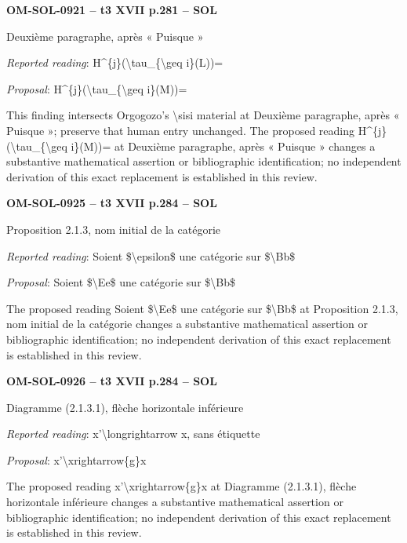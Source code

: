 \par\noindent\textbf{OM-SOL-0921 -- t3 XVII p.281 -- SOL}\par
Deuxième paragraphe, après « Puisque »\par
\emph{Reported reading}: H\textasciicircum{}\{j\}(\textbackslash{}tau\_\{\textbackslash{}geq i\}(L))=\par
\emph{Proposal}: H\textasciicircum{}\{j\}(\textbackslash{}tau\_\{\textbackslash{}geq i\}(M))=\par
This finding intersects Orgogozo's \textbackslash{}sisi material at Deuxième paragraphe, après « Puisque »; preserve that human entry unchanged. The proposed reading H\textasciicircum{}\{j\}(\textbackslash{}tau\_\{\textbackslash{}geq i\}(M))= at Deuxième paragraphe, après « Puisque » changes a substantive mathematical assertion or bibliographic identification; no independent derivation of this exact replacement is established in this review.\par
\par\noindent\textbf{OM-SOL-0925 -- t3 XVII p.284 -- SOL}\par
Proposition 2.1.3, nom initial de la catégorie\par
\emph{Reported reading}: Soient \$\textbackslash{}epsilon\$ une catégorie sur \$\textbackslash{}Bb\$\par
\emph{Proposal}: Soient \$\textbackslash{}Ee\$ une catégorie sur \$\textbackslash{}Bb\$\par
The proposed reading Soient \$\textbackslash{}Ee\$ une catégorie sur \$\textbackslash{}Bb\$ at Proposition 2.1.3, nom initial de la catégorie changes a substantive mathematical assertion or bibliographic identification; no independent derivation of this exact replacement is established in this review.\par
\par\noindent\textbf{OM-SOL-0926 -- t3 XVII p.284 -- SOL}\par
Diagramme (2.1.3.1), flèche horizontale inférieure\par
\emph{Reported reading}: x'\textbackslash{}longrightarrow x, sans étiquette\par
\emph{Proposal}: x'\textbackslash{}xrightarrow\{g\}x\par
The proposed reading x'\textbackslash{}xrightarrow\{g\}x at Diagramme (2.1.3.1), flèche horizontale inférieure changes a substantive mathematical assertion or bibliographic identification; no independent derivation of this exact replacement is established in this review.\par
